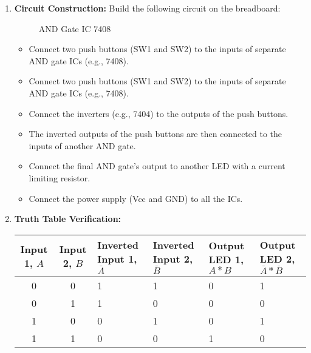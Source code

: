 \begin{enumerate}
    \item \textbf{Circuit Construction:} Build the following circuit on the breadboard:

    \begin{figure}[H]
        \centering
        
        \caption{AND Gate IC 7408}
        \label{fig:and_ic}
    \end{figure}

    \begin{itemize}
        \item Connect two push buttons (SW1 and SW2) to the inputs of separate AND gate ICs (e.g., 7408).
        \item Connect two push buttons (SW1 and SW2) to the inputs of separate AND gate ICs (e.g., 7408).
        \item Connect the inverters (e.g., 7404) to the outputs of the push buttons.
        \item The inverted outputs of the push buttons are then connected to the inputs of another AND gate.
        \item Connect the final AND gate's output to another LED with a current limiting resistor.
        \item Connect the power supply (Vcc and GND) to all the ICs.

    \end{itemize}

    \item \textbf{Truth Table Verification:}

    \renewcommand{\arraystretch}{1.5}
    \begin{table}[h]
        \centering
        \begin{tabular}{c|c|m{2 cm}|m{2 cm}|m{2 cm}|m{2 cm}}
            \hline
            \textbf{Input 1, \( A \)} & \textbf{Input 2, \( B \)} & \textbf{Inverted Input 1, \( \overline{A} \)} & \textbf{Inverted Input 2, \( \overline{B} \)} & \textbf{Output LED 1, \( A * B \)} & \textbf{Output LED 2, \( \overline{A} * \overline{B} \)} \\ \hline
            \hline
            0 & 0 & 1 & 1 & 0 & 1 \\ \hline
            0 & 1 & 1 & 0 & 0 & 0 \\ \hline
            1 & 0 & 0 & 1 & 0 & 1 \\ \hline
            1 & 1 & 0 & 0 & 1 & 0 \\
            \hline
        \end{tabular}
        \label{tab:truth_table}
    \end{table}


\end{enumerate}
